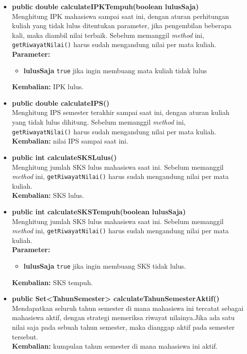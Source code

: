 \begin{enumerate}
\begin{enumerate}
\begin{itemize}
						\item \textbf{public double calculateIPKTempuh(boolean lulusSaja)}\\
				Menghitung IPK mahasiswa sampai saat ini, dengan aturan perhitungan kuliah yang tidak lulus ditentukan parameter, jika pengembilan beberapa kali, maka diambil nilai terbaik. Sebelum memanggil \textit{method} ini, \texttt{getRiwayatNilai()} harus sudah mengandung nilai per mata kuliah.\\
				\textbf{Parameter:} 
				\begin{itemize}
					\item \textbf{lulusSaja} \texttt{true} jika ingin membuang mata kuliah tidak lulus
				\end{itemize}
				\textbf{Kembalian:}  IPK lulus.
			
			\item \textbf{public double calculateIPS()}\\
				Menghitung IPS semester terakhir sampai saat ini, dengan aturan kuliah yang tidak lulus dihitung. Sebelum memanggil \textit{method} ini, \texttt{getRiwayatNilai()} harus sudah mengandung nilai per mata kuliah.\\
				\textbf{Kembalian:}  nilai IPS sampai saat ini.
				
			\item \textbf{public int calculateSKSLulus()}\\
				Menghitung jumlah SKS lulus mahasiswa saat ini. Sebelum memanggil \textit{method} ini, \texttt{getRiwayatNilai()} harus sudah mengandung nilai per mata kuliah.\\
				\textbf{Kembalian:} SKS lulus.
			
			\item \textbf{public int calculateSKSTempuh(boolean lulusSaja)}\\
				Menghitung jumlah SKS lulus mahasiswa saat ini. Sebelum memanggil \textit{method} ini, \texttt{getRiwayatNilai()} harus sudah mengandung nilai per mata kuliah.\\
				\textbf{Parameter:} 
				\begin{itemize}
					\item \textbf{lulusSaja} \texttt{true} jika ingin membuang SKS tidak lulus.
				\end{itemize}
				\textbf{Kembalian:} SKS tempuh.
				
			\item \textbf{public Set<TahunSemester> calculateTahunSemesterAktif()}\\
				Mendapatkan seluruh tahun semester di mana mahasiswa ini tercatat sebagai mahasiswa aktif, dengan strategi memeriksa riwayat nilainya.Jika ada satu nilai saja pada sebuah tahun semester, maka dianggap aktif pada semester tersebut.\\
				\textbf{Kembalian:} kumpulan tahun semester di mana mahasiswa ini aktif.
			

\end{itemize}
\end{enumerate}
\end{enumerate}
